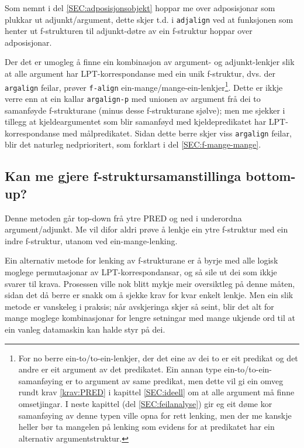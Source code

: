 \documentclass[12pt,a4paper,oneside,draft]{report}
\begin{document}
Som nemnt i del \ref{SEC:adposisjonsobjekt} hoppar me over
 adposisjonar som plukkar ut adjunkt/argument, dette skjer t.d. i
 \texttt{adjalign} ved at funksjonen som henter ut f\hyp{}strukturen til
 adjunkt-døtre av ein f\hyp{}struktur hoppar over adposisjonar.

Der det er umogleg å finne ein kombinasjon av argument- og
 adjunkt-lenkjer slik at alle argument har LPT\hyp{}korrespondanse med ein
 unik f\hyp{}struktur, dvs. der \texttt{argalign} feilar, prøver \texttt{f-align}
 ein-mange/mange-ein-lenkjer\footnote{For no berre ein-to/to-ein-lenkjer, der det eine av dei to er
        eit predikat og det andre er eit argument av det
        predikatet. Ein annan type ein-to/to-ein-samanføying er to
        argument av same predikat, men dette vil gi ein omveg rundt
        krav \ref{krav:PRED} i kapittel \ref{SEC:ideell} om at alle
        argument må finne omsetjingar. I neste kapittel (del
        \ref{SEC:feilanalyse}) gir eg eit døme kor samanføying av
        denne typen ville opna for rett lenking, men der me kanskje
        heller bør ta mangelen på lenking som evidens for at
        predikatet har ein alternativ argumentstruktur. }. Dette er ikkje verre enn at ein
 kallar \texttt{argalign-p} med unionen av argument frå dei to samanføyde
 f\hyp{}strukturane (minus desse f\hyp{}strukturane sjølve); men me sjekker i
 tillegg at kjeldeargumentet som blir samanføyd med kjeldepredikatet
 har LPT\hyp{}korrespondanse med målpredikatet. Sidan dette berre skjer
 viss \texttt{argalign} feilar, blir det naturleg nedprioritert, som forklart
 i del \ref{SEC:f-mange-mange}.

\subsection{Kan me gjere f\hyp{}struktursamanstillinga bottom-up?}
\label{sec-4.1.3}


Denne metoden går top-down frå ytre PRED og ned i underordna
 argument/adjunkt. Me vil difor aldri prøve å lenkje ein ytre
 f\hyp{}struktur med ein indre f\hyp{}struktur, utanom ved ein-mange-lenking.

Ein alternativ metode for lenking av f\hyp{}strukturane er å byrje med
 alle logisk moglege permutasjonar av LPT\hyp{}korrespondansar, og så sile
 ut dei som ikkje svarer til krava. Prosessen ville nok blitt mykje
 meir oversiktleg på denne måten, sidan det då berre er snakk om å
 sjekke krav for kvar enkelt lenkje.  Men ein slik metode er vanskeleg
 i praksis; når avskjeringa skjer så seint, blir det alt for mange
 moglege kombinasjonar for lengre setningar med mange ukjende ord til
 at ein vanleg datamaskin kan halde styr på dei.
\end{document}
